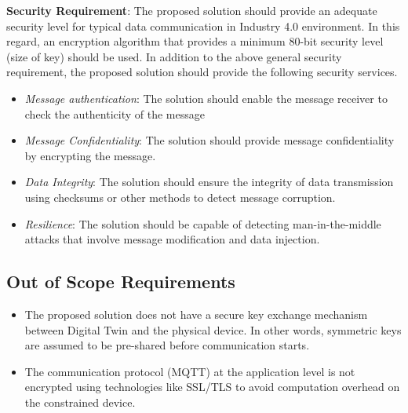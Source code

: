 \textbf{Security Requirement}: The proposed solution should provide an adequate security level for typical data communication in Industry 4.0 environment. In this regard, an encryption algorithm that provides a minimum 80-bit security level (size of key) should be used. In addition to the above general security requirement, the proposed solution should provide the following security services. 
\begin{itemize}
    \item \textit{Message authentication}: The solution should enable the message receiver to check the authenticity of the message 
    \item \textit{Message Confidentiality}: The solution should provide message confidentiality by encrypting the message. 
    \item \textit{Data Integrity}: The solution should ensure the integrity of data transmission using checksums or other methods to detect message corruption.
    \item \textit{Resilience}: The solution should be capable of detecting man-in-the-middle attacks that involve message modification and data injection. 
\end{itemize}




\subsection{Out of Scope Requirements }
\begin{itemize}
    \item The proposed solution does not have a secure key exchange mechanism between Digital Twin and the physical device. In other words, symmetric keys are assumed to be pre-shared before communication starts. 
    \item The communication protocol (MQTT) at the application level is not encrypted using technologies like SSL/TLS to avoid computation overhead on the constrained device. 
    
\end{itemize}


